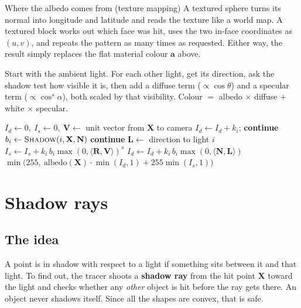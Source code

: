 \documentclass[11pt,a4paper]{article}
\newcommand{\vv}[1]{\mathbf{#1}}
\newcommand{\dotp}[2]{\langle #1, #2\rangle}
\begin{document}
\begin{aside}{Where the albedo comes from (texture mapping)}
A textured sphere turns its normal into longitude and latitude and reads the
texture like a world map. A textured block works out which face was hit, uses
the two in-face coordinates as $(u,v)$, and repeats the pattern as many times as
requested. Either way, the result simply replaces the flat material colour
$\vv a$ above.
\end{aside}

\begin{inshort}
Start with the ambient light. For each other light, get its direction, ask the
shadow test how visible it is, then add a diffuse term ($\propto\cos\theta$) and
a specular term ($\propto\cos^s\alpha$), both scaled by that visibility.
Colour $=$ albedo $\times$ diffuse $+$ white $\times$ specular.
\end{inshort}

\begin{algorithm}[h]
\caption{Direct (Phong) shading at a hit point}
\begin{algorithmic}[1]
\Function{Direct}{$\vv X,\vv N,$ object}
  \State $I_d\gets 0,\ I_s\gets 0,\ \vv V\gets$ unit vector from $\vv X$ to camera
     $I_d\gets I_d+k_i$; \textbf{continue} \EndIf
    \State $b_i\gets\textsc{Shadow}(i,\vv X,\vv N)$
     \textbf{continue}  \EndIf
    \State $\vv L\gets$ direction to light $i$
    \State $I_s \gets I_s + k_i\,b_i \max(0,\dotp{\vv R}{\vv V})^s$ 
    \State $I_d \gets I_d + k_i\,b_i\max(0,\dotp{\vv N}{\vv L})$
  \EndFor
  \State \Return $\min\big(255,\ \text{albedo}(\vv X)\cdot\min(I_d,1) + 255\min(I_s,1)\big)$
\EndFunction
\end{algorithmic}
\end{algorithm}

\section{Shadow rays}\label{sec:shadows}

\subsection{The idea}

A point is in shadow with respect to a light if something sits between it and
that light. To find out, the tracer shoots a \textbf{shadow ray} from the hit
point $\vv X$ toward the light and checks whether any \emph{other} object is hit
before the ray gets there. An object never shadows itself. Since all the shapes
are convex, that is safe.
\end{document}
